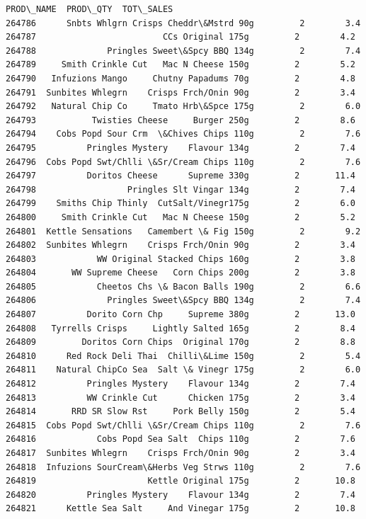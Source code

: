 \documentclass[11pt]{article}
\begin{document}
\begin{tcolorbox}[breakable, size=fbox, boxrule=.5pt, pad at break*=1mm, opacityfill=0]
\begin{Verbatim}[commandchars=\\\{\}]
                                       PROD\_NAME  PROD\_QTY  TOT\_SALES
264786      Snbts Whlgrn Crisps Cheddr\&Mstrd 90g         2        3.4
264787                         CCs Original 175g         2        4.2
264788              Pringles Sweet\&Spcy BBQ 134g         2        7.4
264789     Smith Crinkle Cut   Mac N Cheese 150g         2        5.2
264790   Infuzions Mango     Chutny Papadums 70g         2        4.8
264791  Sunbites Whlegrn    Crisps Frch/Onin 90g         2        3.4
264792   Natural Chip Co     Tmato Hrb\&Spce 175g         2        6.0
264793           Twisties Cheese     Burger 250g         2        8.6
264794    Cobs Popd Sour Crm  \&Chives Chips 110g         2        7.6
264795          Pringles Mystery    Flavour 134g         2        7.4
264796  Cobs Popd Swt/Chlli \&Sr/Cream Chips 110g         2        7.6
264797          Doritos Cheese      Supreme 330g         2       11.4
264798                  Pringles Slt Vingar 134g         2        7.4
264799    Smiths Chip Thinly  CutSalt/Vinegr175g         2        6.0
264800     Smith Crinkle Cut   Mac N Cheese 150g         2        5.2
264801  Kettle Sensations   Camembert \& Fig 150g         2        9.2
264802  Sunbites Whlegrn    Crisps Frch/Onin 90g         2        3.4
264803            WW Original Stacked Chips 160g         2        3.8
264804       WW Supreme Cheese   Corn Chips 200g         2        3.8
264805            Cheetos Chs \& Bacon Balls 190g         2        6.6
264806              Pringles Sweet\&Spcy BBQ 134g         2        7.4
264807          Dorito Corn Chp     Supreme 380g         2       13.0
264808   Tyrrells Crisps     Lightly Salted 165g         2        8.4
264809         Doritos Corn Chips  Original 170g         2        8.8
264810      Red Rock Deli Thai  Chilli\&Lime 150g         2        5.4
264811    Natural ChipCo Sea  Salt \& Vinegr 175g         2        6.0
264812          Pringles Mystery    Flavour 134g         2        7.4
264813          WW Crinkle Cut      Chicken 175g         2        3.4
264814       RRD SR Slow Rst     Pork Belly 150g         2        5.4
264815  Cobs Popd Swt/Chlli \&Sr/Cream Chips 110g         2        7.6
264816            Cobs Popd Sea Salt  Chips 110g         2        7.6
264817  Sunbites Whlegrn    Crisps Frch/Onin 90g         2        3.4
264818  Infuzions SourCream\&Herbs Veg Strws 110g         2        7.6
264819                      Kettle Original 175g         2       10.8
264820          Pringles Mystery    Flavour 134g         2        7.4
264821      Kettle Sea Salt     And Vinegar 175g         2       10.8

\end{Verbatim}
\end{tcolorbox}
\end{document}
